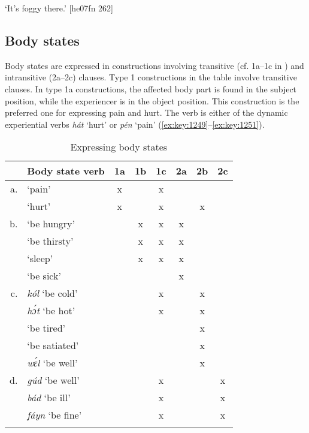 \glt ‘It’s foggy there.’ [he07fn 262]
\z

\subsection{Body states}\label{sec:9.3.8}

Body states are expressed in constructions involving transitive (cf. 1a–1c in ) and intransitive (2a–2c) clauses. Type 1 constructions in the table involve transitive clauses. In type 1a constructions, the affected body part\is{} is found in the subject position, while the experiencer is in the object position. This construction is the preferred one for expressing pain and hurt. The verb is either of the dynamic experiential verbs \textit{hát} ‘hurt’ or \textit{pén} ‘pain’ (\ref{ex:key:1249}–\ref{ex:key:1251}).

\begin{table}
\caption{Expressing body states}
\label{tab:key:9.11}

\begin{tabularx}{\textwidth}{rl CCC CCC}
\lsptoprule

& Body state verb & 1a & 1b & 1c & 2a & 2b & 2c\\
\midrule
a. &  ‘pain’ & x &  & x &  &  & \\
&  ‘hurt’ & x &  & x &  & x & \\

\tablevspace
b. &  ‘be hungry’ &  & x & x & x &  & \\
&  ‘be thirsty’ &  & x & x & x &  & \\
&  ‘sleep’ &  & x & x & x &  & \\
&  ‘be sick’ &  &  &  & x &  & \\

\tablevspace
c. & \textit{kól} ‘be cold’ &  &  & x &  & x & \\
& \textit{hɔ́t} ‘be hot’ &  &  & x &  & x & \\
&  ‘be tired’ &  &  &  &  & x & \\
&  ‘be satiated’ &  &  &  &  & x & \\
& \textit{wɛ́l} ‘be well’ &  &  &  &  & x & \\

\tablevspace
d. & \textit{gúd} ‘be well’ &  &  & x &  &  & x\\
& \textit{bád} ‘be ill’ &  &  & x &  &  & x\\
& \textit{fáyn} ‘be fine’ &  &  & x &  &  & x\\
\lspbottomrule
\end{tabularx}
\end{table}



